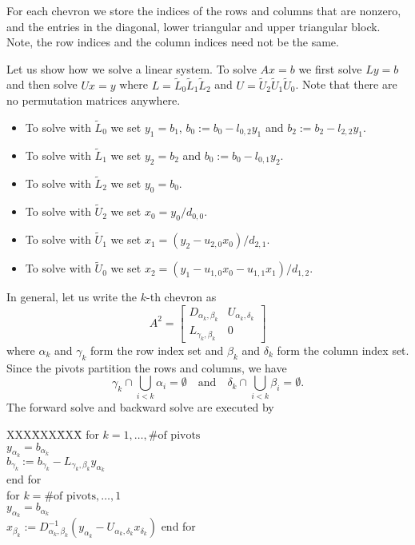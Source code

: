 For each chevron we store 
the indices of the rows and columns that are nonzero,
and the entries in the diagonal, lower triangular and
upper triangular block.
Note, the row indices and the column indices need not be the same.
\par
Let us show how we solve a linear system.
To solve $A x = b$ we first solve $L y = b$ and then solve $U x = y$
where $L = {\tilde L}_0 {\tilde L}_1 {\tilde L}_2$
and $U = {\tilde U}_2 {\tilde U}_1 {\tilde U}_0$.
Note that there are no permutation matrices anywhere.
\begin{itemize}
\item 
To solve with ${\tilde L}_0$ we set $y_1 = b_1$, 
$b_0 := b_0 - l_{0,2} y_1$ and
$b_2 := b_2 - l_{2,2} y_1$.
\item 
To solve with ${\tilde L}_1$ we set $y_2 = b_2$ and
$b_0 := b_0 - l_{0,1} y_2$.
\item 
To solve with ${\tilde L}_2$ we set $y_0 = b_0$.
\item 
To solve with ${\tilde U}_2$ we set $x_0 = y_0/d_{0,0}$.
\item 
To solve with ${\tilde U}_1$ we set $x_1 = (y_2 - u_{2,0}x_0)/d_{2,1}$.
\item 
To solve with ${\tilde U}_0$ 
we set $x_2 = (y_1 - u_{1,0}x_0 - u_{1,1} x_1)/d_{1,2}$.
\end{itemize}

In general, let us write the $k$-th chevron as
$$
A^2 = 
\left \lbrack \begin{array}{cc}
D_{\alpha_k,\beta_k} & U_{\alpha_k,\delta_k} \\
L_{\gamma_k,\beta_k} & 0
\end{array} \right \rbrack
$$
where $\alpha_k$ and $\gamma_k$ form the row index set
and $\beta_k$ and $\delta_k$ form the column index set.
Since the pivots partition the rows and columns, we have
$$
\gamma_k \cap \bigcup_{i < k} \alpha_i = \emptyset
\quad \mbox{and} \quad
\delta_k \cap \bigcup_{i < k} \beta_i = \emptyset.
$$
The forward solve and backward solve are executed by
\begin{center}
\begin{minipage}{3 in}
\begin{tabbing}
XXX\=XXX\=XXX\=\kill
for $k = 1, \ldots, \mbox{\# of pivots}$ \\
\> $y_{\alpha_k} = b_{\alpha_k}$ \\
\> $b_{\gamma_k} := b_{\gamma_k} 
                 - L_{\gamma_k, \beta_k} y_{\alpha_k}$ \\
end for \\
for $k = \mbox{\# of pivots}, \ldots, 1$ \\
\> $y_{\alpha_k} = b_{\alpha_k}$ \\
\> $x_{\beta_k} := D_{\alpha_k, \beta_k}^{-1}
(y_{\alpha_k} - U_{\alpha_k, \delta_k} x_{\delta_k})$ 
end for
\end{tabbing}
\end{minipage}
\end{center}
